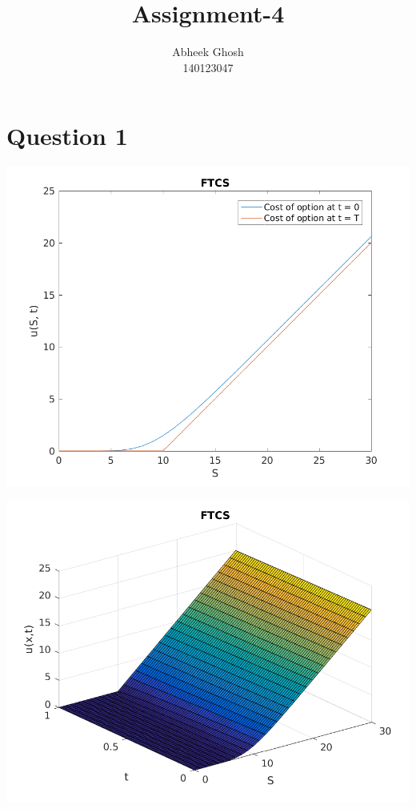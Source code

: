 \documentclass{article}
\begin{document}
	\title{\textbf{Assignment-4}}
	\author{Abheek Ghosh \\ 
		140123047 }
	
	\maketitle

\section{Question 1}

\includegraphics{"q1_1"}
\pagebreak


\includegraphics{"q1_2"}
\pagebreak
\end{document}

